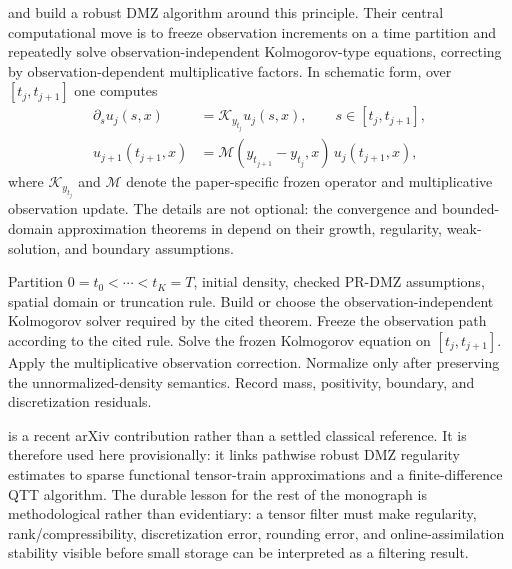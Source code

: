 \citet{yau2000realtime} and \citet{yau2008realtime} build a robust DMZ
algorithm around this principle.  Their central computational move is to
freeze observation increments on a time partition and repeatedly solve
observation-independent Kolmogorov-type equations, correcting by
observation-dependent multiplicative factors.  In schematic form, over
$[t_j,t_{j+1}]$ one computes
\begin{align}
  \partial_s u_j(s,x) &= \mathcal K_{y_{t_j}} u_j(s,x),
       \qquad s\in[t_j,t_{j+1}], \label{eq:bf-hd-frozen-kolmogorov}\\
  u_{j+1}(t_{j+1},x) &=
       \mathcal M(y_{t_{j+1}}-y_{t_j},x)\,u_j(t_{j+1},x),
       \label{eq:bf-hd-memoryless-update}
\end{align}
where $\mathcal K_{y_{t_j}}$ and $\mathcal M$ denote the paper-specific frozen
operator and multiplicative observation update.  The details are not optional:
the convergence and bounded-domain approximation theorems in
\citet{yau2000realtime,yau2008realtime} depend on their growth, regularity,
weak-solution, and boundary assumptions.

\begin{algorithm}
\caption{Robust DMZ offline/online template}
\label{alg:bf-hd-robust-dmz}
\begin{algorithmic}[1]
\Require Partition $0=t_0<\cdots<t_K=T$, initial density, checked PR-DMZ
  assumptions, spatial domain or truncation rule.
\State Build or choose the observation-independent Kolmogorov solver required by
  the cited theorem.
  \State Freeze the observation path according to the cited rule.
  \State Solve the frozen Kolmogorov equation on $[t_j,t_{j+1}]$.
  \State Apply the multiplicative observation correction.
  \State Normalize only after preserving the unnormalized-density semantics.
  \State Record mass, positivity, boundary, and discretization residuals.
\EndFor
\end{algorithmic}
\end{algorithm}

\citet{meng2025regularity} is a recent arXiv contribution rather than a settled
classical reference.  It is therefore used here provisionally: it links pathwise
robust DMZ regularity estimates to sparse functional tensor-train
approximations and a finite-difference QTT algorithm.  The durable lesson for
the rest of the monograph is methodological rather than evidentiary: a tensor
filter must make regularity, rank/compressibility, discretization error,
rounding error, and online-assimilation stability visible before small storage
can be interpreted as a filtering result.

